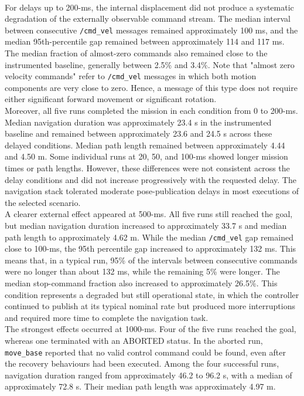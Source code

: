 \\
For delays up to 200-ms, the internal displacement did not produce a systematic degradation of the externally observable command stream. The median interval between consecutive \texttt{/cmd\_vel} messages remained approximately 100 ms, and the median 95th-percentile gap remained between approximately 114 and 117 ms. The median fraction of almost-zero commands also remained close to the instrumented baseline, generally between 2.5\% and 3.4\%. 
Note that "almost zero velocity commands" refer to \texttt{/cmd\_vel} messages in which both motion components are very close to zero. Hence, a message of this type does not require either significant forward movement or significant rotation.
\\
Moreover, all five runs completed the mission in each condition from 0 to 200-ms. Median navigation duration was approximately 23.4 s in the instrumented baseline and remained between approximately 23.6 and 24.5 s across these delayed conditions. Median path length remained between approximately 4.44 and 4.50 m. Some individual runs at 20, 50, and 100-ms showed longer mission times or path lengths. However, these differences were not consistent across the delay conditions and did not increase progressively with the requested delay. The navigation stack tolerated moderate pose-publication delays in most executions of the selected scenario.
\\
A clearer external effect appeared at 500-ms. All five runs still reached the goal, but median navigation duration increased to approximately 33.7 s and median path length to approximately 4.62 m. While the median \texttt{/cmd\_vel} gap remained close to 100-ms, the 95th percentile gap increased to approximately 132 ms. This means that, in a typical run, 95\% of the intervals between consecutive commands were no longer than about 132 ms, while the remaining 5\% were longer. The median stop-command fraction also increased to approximately 26.5\%. This condition represents a degraded but still operational state, in which the controller continued to publish at its typical nominal rate but produced more interruptions and required more time to complete the navigation task.
\\
The strongest effects occurred at 1000-ms. Four of the five runs reached the goal, whereas one terminated with an ABORTED status. In the aborted run, \texttt{move\_base} reported that no valid control command could be found, even after the recovery behaviours had been executed. Among the four successful runs, navigation duration ranged from approximately 46.2 to 96.2 s, with a median of approximately 72.8 s. Their median path length was approximately 4.97 m.

